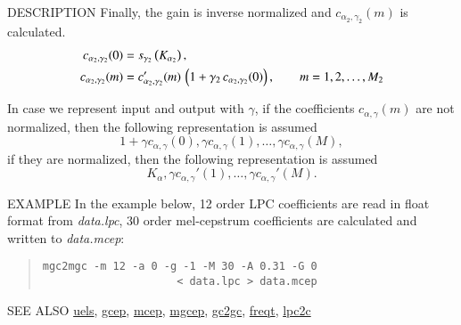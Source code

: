 \begin{qsection}{DESCRIPTION}
Finally, the gain is inverse normalized and $c_{\alpha_2,\gamma_2}(m)$
is calculated.
\begin{align}
c_{\alpha_2,\gamma_2}(0) &= 
	s_{\gamma_2}\left(K_{\alpha_2}\right), \notag \\
c_{\alpha_2,\gamma_2}(m) &= 
          c_{\alpha_2,\gamma_2}'(m)\,\left(1+\gamma_2\, 
          c_{\alpha_2,\gamma_2}(0)\right), 
          \qquad m = 1,2,\dots, M_2 \notag
\end{align}

In case we represent input and output with $\gamma$,
if the coefficients $c_{\alpha,\gamma}(m)$ are not normalized, then
the following representation is assumed
\begin{displaymath}
1+\gamma c_{\alpha,\gamma}(0), \gamma c_{\alpha,\gamma}(1), \dots, \gamma c_{\alpha,\gamma}(M),
\end{displaymath}
if they are normalized, then
the following representation is assumed
\begin{displaymath}
K_\alpha,\gamma c_{\alpha,\gamma}'(1),\dots, \gamma c_{\alpha,\gamma}'(M).
\end{displaymath}

\end{qsection}

\begin{options}
\end{options}

\begin{qsection}{EXAMPLE}
In the example below, 12 order LPC coefficients are read in
float format from {\em data.lpc}, 30 order mel-cepstrum
coefficients are calculated and written to {\em data.mcep}:
\begin{quote}
 \verb!mgc2mgc -m 12 -a 0 -g -1 -M 30 -A 0.31 -G 0!\\
 \verb!                     < data.lpc > data.mcep!
\end{quote} 
\end{qsection}

\begin{qsection}{SEE ALSO}
\hyperlink{uels}{uels},
\hyperlink{gcep}{gcep},
\hyperlink{mcep}{mcep},
\hyperlink{mgcep}{mgcep},
\hyperlink{gc2gc}{gc2gc},
\hyperlink{freqt}{freqt},
\hyperlink{lpc2c}{lpc2c}
\end{qsection}
